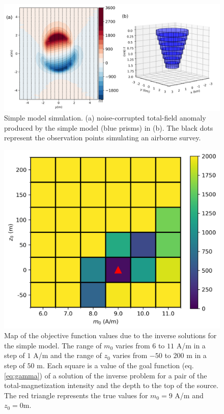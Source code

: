 \begin{figure}
    \centering
    \includegraphics[scale=.5]{figures/wedding_cake_model_data.png}
    \caption{Simple model simulation. (a) noise-corrupted total-field anomaly produced by the simple model (blue prisms) in (b). The black dots represent the observation points simulating an airborne survey.
}
    \label{fig:kimb_model}
\end{figure}

\begin{figure}
	\centering
	\includegraphics[scale=.75]{figures/wedding_cake_obj_func_map.png}
	\caption{Map of the objective function values due to the inverse solutions for the simple model. The range of $m_0$ varies from $6$ to $11$ A/m in a step of $1$ A/m and the range of $z_0$ varies from $-50$ to $200$ m in a step of $50$ m. Each square is a value of the goal function (eq. \ref{eq:gamma}) of a solution of the inverse problem for a pair of the total-magnetization intensity and the depth to the top of the source. The red triangle represents the true values for $m_0 = 9$ A/m and $z_0=0$m.
	}
	\label{fig:kimb_map}
\end{figure}

